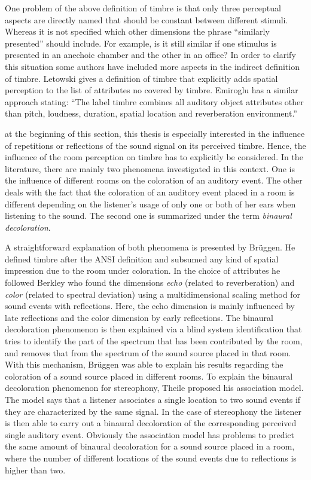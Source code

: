 One problem of the above definition of timbre is that only
three perceptual aspects are directly named that should be constant between
different stimuli. Whereas it is not specified which
other dimensions the phrase ``similarly presented'' should include.
For example, is it still similar
if one stimulus is presented in an anechoic chamber and the other in an
office?
In order to clarify this situation some authors have included more aspects in
the indirect definition of timbre.
Letowski\autocite{Letowski1989} gives a
definition of timbre that explicitly adds spatial perception to the list of
attributes no covered by timbre. 
Emiroglu\autocite[][p. 89]{Emiroglu2007} has a similar approach stating:
``The label timbre combines all auditory object attributes other
than pitch, loudness, duration, spatial location and reverberation
environment.''

 at the beginning of this section, this thesis is especially interested
in the influence of repetitions or reflections of the sound signal on its
perceived timbre. Hence, the influence of the room perception on timbre has to
explicitly be considered. In the literature, there are mainly two phenomena
investigated in this context. One is the influence of different rooms on the
coloration of an auditory event. The other deals with the
fact that the coloration of an auditory event placed in a room is different
depending on the listener's usage of only one or both of her ears when listening
to the sound. The second one is summarized under the term
\emph{binaural decoloration}.\autocite[It was first reported by][]{Koenig1950}

A straightforward explanation of both phenomena is presented by
Brüggen\autocite{Bruggen2001}. He defined timbre after the
ANSI definition\autocite{ANSI1994} and
subsumed any kind of spatial impression due to the room under coloration. In the
choice of attributes he
followed Berkley\autocite{Berkley1987} who found the dimensions \emph{echo}
(related to reverberation) and
\emph{color} (related to spectral deviation) 
using a multidimensional scaling method for sound events with
reflections. Here, the echo dimension is mainly influenced by late reflections
and the color dimension by early reflections. The binaural decoloration
phenomenon is then explained via a blind system identification that tries to
identify the part of the spectrum that has been contributed by the room,
and removes that from the spectrum of the
sound source placed in that room. With this mechanism, Brüggen was able to
explain his results regarding the coloration of a sound source placed in
different rooms.\autocite[][Fig.\,5.11]{Bruggen2001}
\FloatBarrier
To explain the binaural decoloration phenomenon for stereophony,
Theile\autocite{Theile1980} proposed his association model. The model says that a
listener associates a single location to two sound events if they are
characterized by the same signal.
In the case of stereophony the listener is then able to carry out a
binaural decoloration of the corresponding perceived single auditory event.
Obviously the association model has problems to predict the same amount
of binaural decoloration for a sound source placed in a room, where the number
of different locations of the sound events due to reflections is higher than two.

